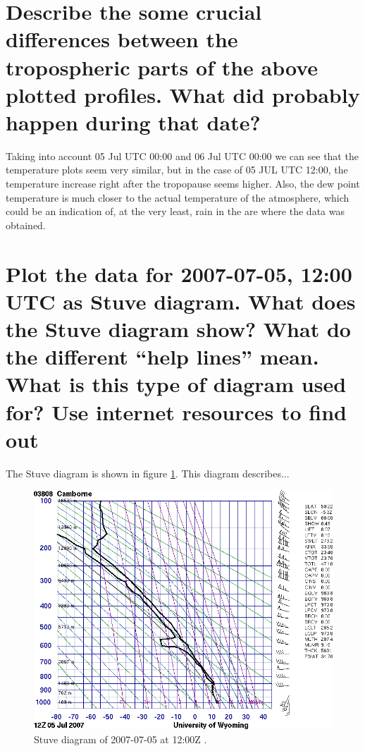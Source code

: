 \documentclass{article}
\begin{document}
\section{Describe the some crucial differences between the tropospheric parts of the above plotted profiles. What did probably happen during that date?}

 Taking into account 05 Jul UTC 00:00  and 06 Jul UTC 00:00 we can see that the temperature plots seem very similar, but in the case of 05 JUL UTC 12:00, the temperature increase right after the tropopause seems higher. Also, the dew point temperature is much closer to the actual temperature of the atmosphere, which could be an indication of, at the very least, rain in the are where the data was obtained. 



\newpage
\section{Plot the data for 2007-07-05, 12:00 UTC as Stuve diagram. What does the Stuve diagram show? What do the different “help lines” mean. What is this type of diagram used for? Use internet resources to find out}
The Stuve diagram is shown in figure \ref{fig:Q7}. This diagram describes...

\begin{figure}[H]
	\centering
	\includegraphics[width=.8\textwidth]{figures/stuve.png}
	\caption{Stuve diagram of 2007-07-05 at 12:00Z \cite{assignment}.}
	\label{fig:Q7}
\end{figure}

\newpage				%


\end{document}
